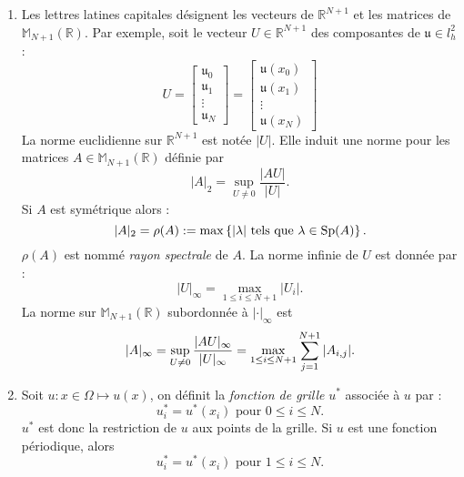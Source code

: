 \begin{enumerate}
\item Les lettres latines capitales désignent les vecteurs de $\mathbb{R}^{N+1}$ et les matrices de $\mathbb{M}_{N+1}(\mathbb{R})$. Par exemple, soit le vecteur $U \in \mathbb{R}^{N+1}$ des composantes de $\mathfrak{u} \in l^2_h$ :
\begin{equation}
U = \begin{bmatrix}
\mathfrak{u}_0 \\ \mathfrak{u}_1 \\ \vdots \\ \mathfrak{u}_N
\end{bmatrix} =
\begin{bmatrix}
\mathfrak{u}(x_0) \\ \mathfrak{u}(x_1) \\ \vdots \\ \mathfrak{u}(x_N)
\end{bmatrix}
\end{equation}
La norme euclidienne sur $\mathbb{R}^{N+1}$ est notée $|U|$. Elle induit une norme pour les matrices $A \in \mathbb{M}_{N+1}(\mathbb{R})$ définie par
\begin{equation}
|A|_2 = \sup_{U \neq 0} \dfrac{|AU|}{|U|}.
\end{equation}
Si $A$ est symétrique alors :
\begin{equation}
|A|_2 = \rho(A) := \max \left\lbrace |\lambda| \text{ tels que } \lambda \in \text{Sp} (A) \right\rbrace.
\end{equation}
$\rho(A)$ est nommé \textit{rayon spectrale} de $A$.
La norme infinie de $U$ est donnée par :
\begin{equation}
|U|_{\infty} = \max_{1 \leq i \leq N+1} |U_i|.
\end{equation}
La norme sur $\mathbb{M}_{N+1}(\mathbb{R})$ subordonnée à $|\cdot|_{\infty}$ est
\begin{equation}
|A|_{\infty} = \sup_{U \neq 0} \dfrac{|AU|_{\infty}}{|U|_{\infty}} = \max_{1 \leq i \leq N+1} \displaystyle\sum\limits_{j=1}^{N+1} |A_{i,j}|.
\end{equation}

\item Soit $u: x \in \Omega \mapsto u(x)$, on définit la \textit{fonction de grille} $u^*$ associée à $u$ par :
\begin{equation}
u^*_i = u^*(x_i) \text{ pour } 0 \leq i \leq N.
\end{equation}
$u^*$ est donc la restriction de $u$ aux points de la grille. Si $u$ est une fonction périodique, alors 
\begin{equation}
u^*_i = u^*(x_i) \text{ pour } 1 \leq i \leq N.
\end{equation}
\end{enumerate}

